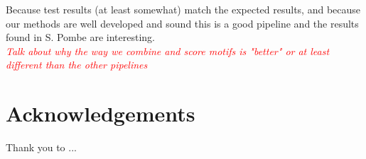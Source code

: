 \documentclass[12pt]{article}
\newenvironment{SLOPPY}{\begin{sloppypar}\hbadness=10000}{\end{sloppypar}}
\newcommand{\comment}[1]{\textcolor{red}{\it{#1}}}
\begin{document}
\begin{SLOPPY}
Because test results (at least somewhat) match the expected results, and
because our methods are well developed and sound this is a
good pipeline and the results found in S. Pombe are interesting.\\
\comment{Talk about why the way we combine and score motifs is "better" or
at least
different than the other pipelines}
\end{SLOPPY}

\section*{Acknowledgements}

Thank you to ...


\nocite{*}

%
\end{document}
